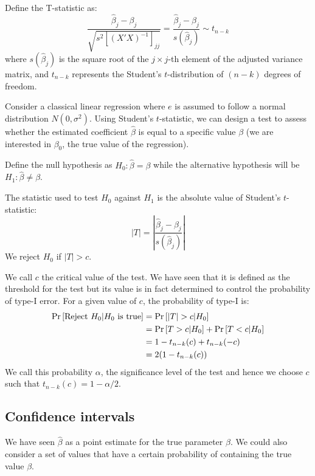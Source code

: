 \begin{definition}[T-statistic]
Define the T-statistic as: $$ \frac{\hat{\beta}_j - \beta_j}{\sqrt{s^2\left[(X'X)^{-1}\right]_{jj}}} = \frac{\hat{\beta}_j - \beta_j}{s(\hat\beta_j)} \sim t_{n-k} $$ where $s(\hat\beta_j)$ is the square root of the $j\times j$-th element of the adjusted variance matrix, and $t_{n-k}$ represents the Student's $t$-distribution of $(n-k)$ degrees of freedom.
\end{definition}

Consider a classical linear regression where $e$ is assumed to follow a normal distribution $N(0,\sigma^2)$. Using Student's $t$-statistic, we can design a test to assess whether the estimated coefficient $\hat\beta$ is equal to a specific value $\beta$ (we are interested in $\beta_0$, the true value of the regression).

\begin{proposition}
Define the null hypothesis as $H_0 : \hat\beta = \beta$ while the alternative hypothesis will be $H_1:\hat\beta \neq \beta$.

The statistic used to test $H_0$ against $H_1$ is the absolute value of Student's $t$-statistic: $$\vert T\vert = \left\vert \frac{\hat{\beta}_j - \beta_j}{s(\hat\beta_j)} \right\vert $$ We reject $H_0$ if $\vert T\vert > c$. 
\end{proposition}

We call $c$ the critical value of the test. We have seen that it is defined as the threshold for the test but its value is in fact determined to control the probability of type-I error. For a given value of $c$, the probability of type-I is:\begin{align*}
\operatorname{Pr}\left[\text{Reject }H_0\vert H_0\text{ is true}\right] & = \operatorname{Pr}\left[\vert T\vert >c\vert H_0\right] \\
& = \operatorname{Pr}\left[T>c\vert H_0\right] + \operatorname{Pr}\left[T<c\vert H_0\right] \\
& = 1 - t_{n-k}(c) + t_{n-k}(-c) \\
& = 2(1 - t_{n-k}(c))
\end{align*} We call this probability $\alpha$, the significance level of the test and hence we choose $c$ such that $t_{n-k}(c) = 1 - \alpha /2$.

\subsection{Confidence intervals}

We have seen $\hat\beta$ as a point estimate for the true parameter $\beta$. We could also consider a set of values that have a certain probability of containing the true value $\beta$.

